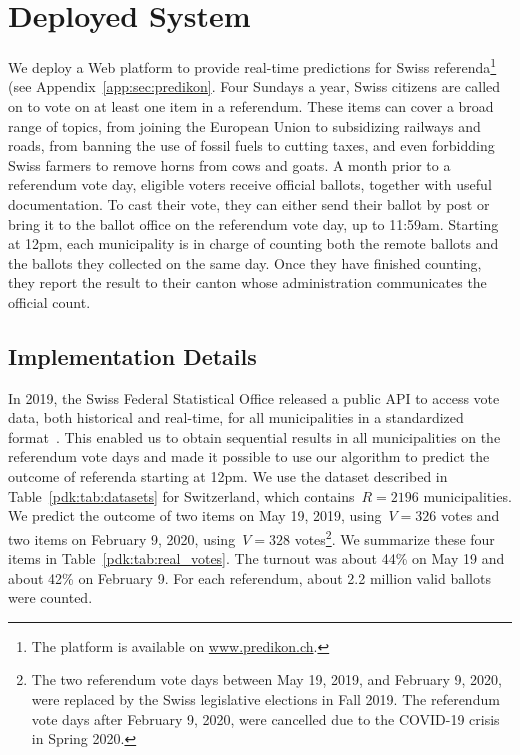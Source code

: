 \section{Deployed System}%
\label{pdk:sec:depsys}

We deploy a Web platform to provide real-time predictions for Swiss referenda\footnote{The platform is available on \href{http://www.predikon.ch}{www.predikon.ch}.} (see Appendix~\ref{app:sec:predikon}.
Four Sundays a year, Swiss citizens are called on to vote on at least one item in a referendum.
These items can cover a broad range of topics, from joining the European Union to subsidizing railways and roads, from banning the use of fossil fuels to cutting taxes, and even forbidding Swiss farmers to remove horns from cows and goats.
A month prior to a referendum vote day, eligible voters receive official ballots, together with useful documentation.
To cast their vote, they can either send their ballot by post or bring it to the ballot office on the referendum vote day, up to 11:59am.
Starting at 12pm, each municipality is in charge of counting both the remote ballots and the ballots they collected on the same day.
Once they have finished counting, they report the result to their canton whose administration communicates the official count.

\subsection{Implementation Details}

In 2019, the Swiss Federal Statistical Office released a public API to access vote data, both historical and real-time, for all municipalities in a standardized format~\cite{confederation2020open}.
This enabled us to obtain sequential results in all municipalities on the referendum vote days and made it possible to use our algorithm to predict the outcome of referenda starting at 12pm.
We use the dataset described in Table~\ref{pdk:tab:datasets} for Switzerland, which contains~$R = 2196$ municipalities.
We predict the outcome of two items on May 19, 2019, using~$V = 326$ votes and two items on February 9, 2020, using~$V = 328$ votes\footnote{The two referendum vote days between May 19, 2019, and February 9, 2020, were replaced by the Swiss legislative elections in Fall 2019. The referendum vote days after February 9, 2020, were cancelled due to the COVID-19 crisis in Spring 2020.}.
We summarize these four items in Table~\ref{pdk:tab:real_votes}.
The turnout was about 44\% on May 19 and about 42\% on February 9.
For each referendum, about 2.2 million valid ballots were counted.

